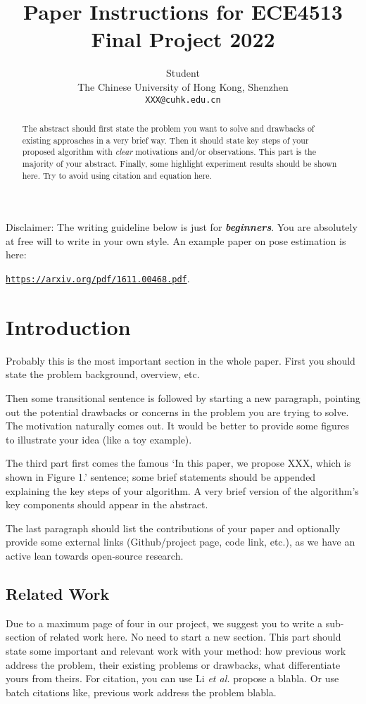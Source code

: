 \documentclass{article}
\title{Paper Instructions for ECE4513 Final Project 2022}
\author{
  Student \\
  The Chinese University of Hong Kong, Shenzhen\\
  \texttt{XXX@cuhk.edu.cn} \\
   \And
}
\begin{document}
\maketitle

\begin{abstract}
  The abstract should first state the problem you want to solve and drawbacks of existing approaches in a very brief way. Then it should state key steps of your proposed algorithm with \textit{clear} motivations and/or observations. This part is the majority of your abstract. Finally, some highlight experiment results should be shown here. Try to avoid using citation and equation here.
\end{abstract}


Disclaimer: The writing guideline below is just for \textbf{\textit{beginners}}. You are absolutely at free will to write in your own style.
%
An example paper on pose estimation is here:

 \href{https://arxiv.org/pdf/1611.00468.pdf}{\texttt{https://arxiv.org/pdf/1611.00468.pdf}}.

\section{Introduction}

Probably this is the most important section in the whole paper. First you should state the problem background, overview, etc.

Then some transitional sentence is followed by starting a new paragraph, pointing out the potential drawbacks or concerns in the problem you are trying to solve. The motivation  naturally comes out. It would be better to provide some figures to illustrate your idea (like a toy example).

The third part first comes the famous `In this paper, we propose XXX, which is shown in Figure 1.' sentence; some brief statements should be appended explaining the key steps of your algorithm. A very brief version of the algorithm's key components should appear in the abstract.

The last paragraph should list the contributions of your paper and optionally provide some external links (Github/project page, code link, etc.), as we have an active lean towards open-source research.

\subsection{Related Work}
Due to a maximum page of four in our project, we suggest you to write a sub-section of related work here. No need to start a new section. This part should state some important and relevant work with your method: how previous work address the problem, their existing problems or drawbacks, what differentiate yours from theirs. For citation, you can use Li \textit{et al.} \cite{MCG} propose a blabla. Or use batch citations like, previous work \cite{bing,scale_aware,Hosang2015Pami} address the problem blabla.
\end{document}
